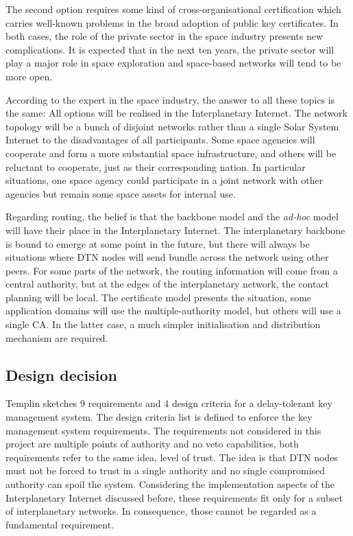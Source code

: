 The second option requires some kind of cross-organisational certification which carries well-known problems in the broad adoption of public key certificates. In both cases, the role of the private sector in the space industry presents new complications. It is expected that in the next ten years, the private sector will play a major role in space exploration and space-based networks will tend to be more open. 


According to the expert in the space industry, the answer to all these topics is the same: All options will be realised in the Interplanetary Internet. The network topology will be a bunch of disjoint networks rather than a single Solar System Internet to the disadvantages of all participants. Some space agencies will cooperate and form a more substantial space infrastructure, and others will be reluctant to cooperate, just as their corresponding nation. In particular situations, one space agency could participate in a joint network with other agencies but remain some space assets for internal use.  

Regarding routing, the belief is that the backbone model and the \textit{ad-hoc} model will have their place in the Interplanetary Internet. The interplanetary backbone is bound to emerge at some point in the future, but there will always be situations where DTN nodes will send bundle across the network using other peers. For some parts of the network, the routing information will come from a central authority, but at the edges of the interplanetary network, the contact planning will be local. The certificate model presents the situation, some application domains will use the multiple-authority model, but others will use a single CA. In the latter case, a much simpler initialisation and distribution mechanism are required. 

\subsection{Design decision}


Templin \cite{templin-dtnskmreq-00} sketches 9 requirements and 4 design criteria for a delay-tolerant key management system. The design criteria list is defined to enforce the key management system requirements. The requirements not considered in this project are multiple points of authority and no veto capabilities, both requirements refer to the same idea, level of trust. The idea is that DTN nodes must not be forced to trust in a single authority and no single compromised authority can spoil the system. Considering the implementation aspects of the Interplanetary Internet discussed before, these requirements fit only for a subset of interplanetary networks. In consequence, those cannot be regarded as a fundamental requirement. 

